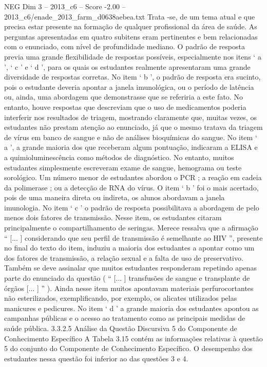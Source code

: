 \begin{textsample}{NEG Dim 3 – 2013\_c6 – Score -2.00 – 2013\_c6/enade\_2013\_farm\_d0638aebea.txt}
Trata -se, de um tema atual e que precisa estar presente na formação de qualquer profissional da área de saúde.
As perguntas apresentadas em quatro subitens eram pertinentes e bem relacionadas com o enunciado, com nível de profundidade mediano.
O padrão de resposta previa uma grande flexibilidade de respostas possíveis, especialmente nos itens ‘ a ’, ‘ c ’ e ‘ d ’, para os quais os estudantes realmente apresentaram uma grande diversidade de respostas corretas.
No item ‘ b ’, o padrão de resposta era sucinto, pois o estudante deveria apontar a janela imunológica, ou o período de latência ou, ainda, uma abordagem que demonstrasse que se referiria a este fato.
No entanto, houve respostas que descreviam que o uso de medicamentos poderia interferir nos resultados de triagem, mostrando claramente que, muitas vezes, os estudantes não prestam atenção ao enunciado, já que o mesmo tratava da triagem de vírus em banco de sangue e não de análises bioquímicas do sangue.
No item ‘ a ’, a grande maioria dos que receberam algum pontuação, indicaram a ELISA e a quimioluminescência como métodos de diagnóstico.
No entanto, muitos estudantes simplesmente escreveram exame de sangue, hemograma ou teste sorológico.
Um número menor de estudantes abordou o PCR ; a reação em cadeia da polimerase ; ou a detecção de RNA do vírus.
O item ‘ b ’ foi o mais acertado, pois de uma maneira direta ou indireta, os alunos abordavam a janela imunologia.
No item ‘ c ’ o padrão de resposta possibilitava a abordagem de pelo menos dois fatores de transmissão.
Nesse item, os estudantes citaram principalmente o compartilhamento de seringas.
Merece ressalva que a afirmação “ [... ] considerando que seu perfil de transmissão é semelhante ao HIV ”, presente no final do texto do item, induziu a maioria dos estudantes a apontar como um dos fatores de transmissão, a relação sexual e a falta de uso de preservativo.
Também se deve assinalar que muitos estudantes responderam repetindo apenas parte do enunciado da questão ( “ [... ] transfusões de sangue e transplante de órgãos [... ] ” ).
Ainda nesse item muitos apontavam materiais perfurocortantes não esterilizados, exemplificando, por exemplo, os alicates utilizados pelas manicures e pedicures.
No item ‘ d ’ a grande maioria dos estudantes apontou as campanhas públicas e o acesso ao tratamento como as principais medidas de saúde pública. 3.3.2.5 Análise da Questão Discursiva 5 do Componente de Conhecimento Específico A Tabela 3.15 contém as informações relativas à questão 5 do conjunto do Componente de Conhecimento Específico.
O desempenho dos estudantes nessa questão foi inferior ao das questões 3 e 4.

\end{textsample}
